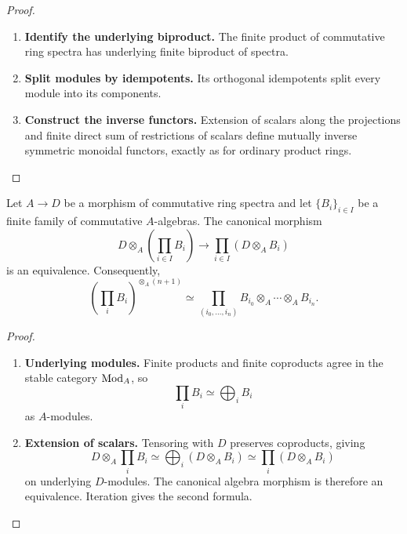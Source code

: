 \begin{proof}
\leavevmode
\begin{enumerate}[label=\textup{(\arabic*)}]
    \item \textbf{Identify the underlying biproduct.}
    The finite product of commutative ring spectra has underlying finite
    biproduct of spectra.

    \item \textbf{Split modules by idempotents.}
    Its orthogonal idempotents split every module into
    its components.

    \item \textbf{Construct the inverse functors.}
    Extension of scalars along the projections and finite
    direct sum of restrictions of scalars define mutually inverse symmetric
    monoidal functors, exactly as for ordinary product rings.
\end{enumerate}
\end{proof}

\begin{lemma}
\label{lem:finite-products-base-change}
Let \(A\to D\) be a morphism of commutative ring spectra and let
\(\{B_i\}_{i\in I}\) be a finite family of commutative \(A\)-algebras. The
canonical morphism
\[
    D\otimes_A\left(\prod_{i\in I}B_i\right)
    \longrightarrow
    \prod_{i\in I}(D\otimes_AB_i)
\]
is an equivalence. Consequently,
\[
    \left(\prod_iB_i\right)^{\otimes_A(n+1)}
    \simeq
    \prod_{(i_0,\ldots,i_n)}
    B_{i_0}\otimes_A\cdots\otimes_AB_{i_n}.
\]
\end{lemma}

\begin{proof}
\leavevmode
\begin{enumerate}[label=\textup{(\arabic*)}]
    \item \textbf{Underlying modules.}
    Finite products and finite coproducts agree in the stable category
    \(\operatorname{Mod}_A\), so
    \[
        \prod_iB_i\simeq\bigoplus_iB_i
    \]
    as \(A\)-modules.

    \item \textbf{Extension of scalars.}
    Tensoring with \(D\) preserves coproducts, giving
    \[
        D\otimes_A\prod_iB_i
        \simeq
        \bigoplus_i(D\otimes_AB_i)
        \simeq
        \prod_i(D\otimes_AB_i)
    \]
    on underlying \(D\)-modules. The canonical algebra morphism is therefore
    an equivalence. Iteration gives the second formula.
\end{enumerate}
\end{proof}

